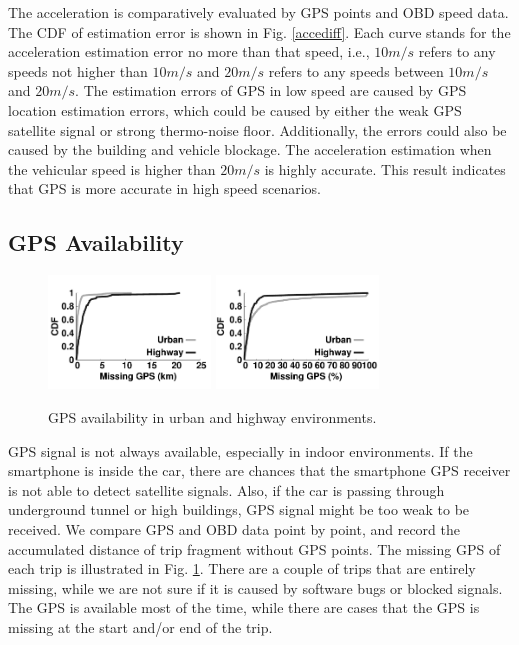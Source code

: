 The acceleration is comparatively evaluated by GPS points and OBD speed data.  
The CDF of estimation error is shown in Fig. \ref{accediff}. 
Each curve stands for the acceleration estimation error no more than that speed, i.e., 
$10m/s$ refers to any speeds not higher than $10m/s$ and $20m/s$ refers to any speeds between $10m/s$ and $20m/s$. 
The estimation errors of GPS in low speed are caused by GPS location estimation errors, which could be caused by either the weak GPS satellite signal or strong thermo-noise floor. 
Additionally, the errors could also be caused by the building and vehicle blockage.  
The acceleration estimation when the vehicular speed is higher than $20m/s$ 
is highly accurate. 
This result indicates that GPS is more accurate in high speed scenarios.




\subsection{GPS Availability}



\begin{figure}[!tb]
\begin{center}
\includegraphics[width=1.7in,angle=0]{Figs/DriveSense/missing_gps.pdf}
\hspace{-0.5cm}
\includegraphics[width=1.7in,angle=0]{Figs/DriveSense/missing_percent.pdf}
\vspace{-0.2cm}
\caption{GPS availability in urban and highway environments. }
\vspace{-0.2cm}
\label{missinggps}
\end{center}
\end{figure}


GPS signal is not always available, especially in indoor
environments.
If the smartphone is inside the car, there are chances
that the smartphone GPS receiver is not able 
to detect satellite signals.  
Also, if the car is passing through underground tunnel or high buildings, 
GPS signal might be too weak to be received. 
We compare GPS and OBD data point by point, 
and record the accumulated distance of trip fragment without GPS points. 
The missing GPS of each trip is illustrated in Fig. \ref{missinggps}. 
There are a couple of trips that are entirely missing, 
while we are not sure if it is caused by software bugs or blocked signals. 
The GPS is available most of the time, while there are cases
that the GPS is missing at the start and/or end of the trip. 




